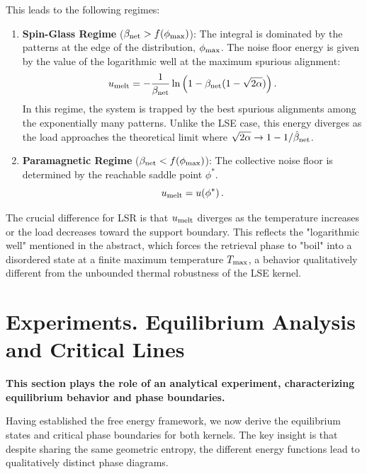 \documentclass{article}
\theoremstyle{plain}
\theoremstyle{definition}
\theoremstyle{remark}
\begin{document}
This leads to the following regimes:
\begin{enumerate}
    \item \textbf{Spin-Glass Regime} ($\beta_{\rm net} > f(\phi_{\rm max})$): 
    The integral is dominated by the patterns at the edge of the distribution, $\phi_{\rm max}$. The noise floor energy is given by the value of the logarithmic well at the maximum spurious alignment:
    \begin{equation}
        u_{\rm melt} = -\frac{1}{\beta_{\rm net}} \ln \left( 1 - \beta_{\rm net} (1 - \sqrt{2\alpha}) \right).
    \end{equation}
    In this regime, the system is trapped by the best spurious alignments among the exponentially many patterns. Unlike the LSE case, this energy diverges as the load approaches the theoretical limit where $\sqrt{2\alpha} \to 1 - 1/\hat\beta_{\rm net}$.
    
    \item \textbf{Paramagnetic Regime} ($\beta_{\rm net} < f(\phi_{\rm max})$): 
    The collective noise floor is determined by the reachable saddle point $\phi^*$. 
    \begin{equation}
        u_{\rm melt} = u(\phi^*)\,.
    \end{equation}
    
\end{enumerate}


The crucial difference for LSR is that $u_{\rm melt}$ diverges as the temperature increases or the load decreases toward the support boundary. This reflects the "logarithmic well" mentioned in the abstract, which forces the retrieval phase to "boil" into a disordered state at a finite maximum temperature $T_{\rm max}$, a behavior qualitatively different from the unbounded thermal robustness of the LSE kernel.


\section{Experiments. Equilibrium Analysis and Critical Lines}

\textbf{This section plays the role of an analytical experiment, characterizing equilibrium behavior and phase boundaries.}

Having established the free energy framework, we now derive the equilibrium states and critical phase boundaries for both kernels. The key insight is that despite sharing the same geometric entropy, the different energy functions lead to qualitatively distinct phase diagrams.
\end{document}
